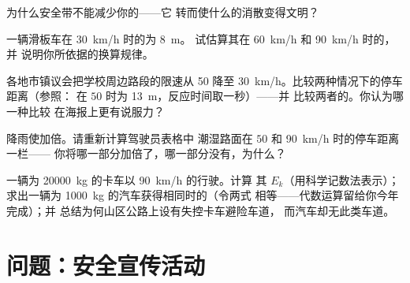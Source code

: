 \begin{exercise}[$\star$]\label{exo:g9:kinetic-energy-safety:8}
为什么安全带不能减少你的——它
转而使什么的消散变得文明？
\end{exercise}

\begin{exercise}[$\star\star$]\label{exo:g9:kinetic-energy-safety:9}
一辆滑板车在 \qty{30}{km/h} 时的为 \qty{8}{m}。
试估算其在 \qty{60}{km/h} 和 \qty{90}{km/h} 时的，并
说明你所依据的换算规律。
\end{exercise}

\begin{exercise}[$\star\star$]\label{exo:g9:kinetic-energy-safety:10}
各地市镇议会把学校周边路段的限速从 \qty{50}{} 降至
\qty{30}{km/h}。比较两种情况下的停车距离（参照：
在 $50$ 时为 \qty{13}{m}，反应时间取一秒）——并
比较两者的。你认为哪一种比较
在海报上更有说服力？
\end{exercise}

\begin{exercise}[$\star\star$]\label{exo:g9:kinetic-energy-safety:11}
降雨使加倍。请重新计算驾驶员表格中
潮湿路面在 $50$ 和 \qty{90}{km/h} 时的停车距离一栏——
你将哪一部分加倍了，哪一部分没有，为什么？
\end{exercise}

\begin{exercise}[$\star\star\star$]\label{exo:g9:kinetic-energy-safety:12}
一辆为 \qty{20000}{kg} 的卡车以 \qty{90}{km/h} 的行驶。计算
其 $E_k$（用科学记数法表示）；求出一辆为
\qty{1000}{kg} 的汽车获得相同时的（令两式
相等——代数运算留给你今年完成）；并
总结为何山区公路上设有失控卡车避险车道，
而汽车却无此类车道。
\end{exercise}

\section{问题：安全宣传活动}

